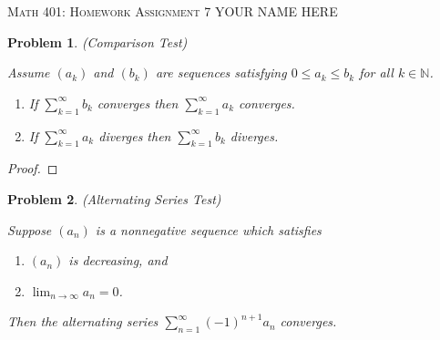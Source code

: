 \documentclass[12pt]{article}
\newtheorem{problem}{Problem}
\newcommand{\NN}{\ensuremath{\mathbb N}}
\newcommand{\ds}{\displaystyle}
\begin{document}
\small
\noindent \textsc{Math 401: Homework Assignment 7} \hfill YOUR NAME HERE

\normalsize
\bigskip

\setcounter{problem}{43}

\begin{problem} %
(Comparison Test)

\medskip
\noindent Assume $(a_k)$ and $(b_k)$ are sequences satisfying $0\le a_k \le b_k$ for all $k\in\NN$.

\renewcommand{\labelenumi}{\emph{(\roman{enumi})}}
\begin{enumerate}
\item If $\sum_{k=1}^\infty b_k$ converges then $\sum_{k=1}^\infty a_k$ converges.
\item If $\sum_{k=1}^\infty a_k$ diverges then $\sum_{k=1}^\infty b_k$ diverges.
\end{enumerate}
\end{problem}


\begin{proof}
\end{proof}


\begin{problem} %
(Alternating Series Test)

\medskip
\noindent Suppose $(a_n)$ is a \emph{nonnegative} sequence which satisfies
\renewcommand{\labelenumi}{\emph{(\roman{enumi})}}
\begin{enumerate}
\item $(a_n)$ is decreasing, and
\item $\ds \lim_{n\to\infty} a_n = 0$.
\end{enumerate}
Then the alternating series $\ds \sum_{n=1}^\infty (-1)^{n+1} a_n$ converges.
\end{problem}

\end{document}

